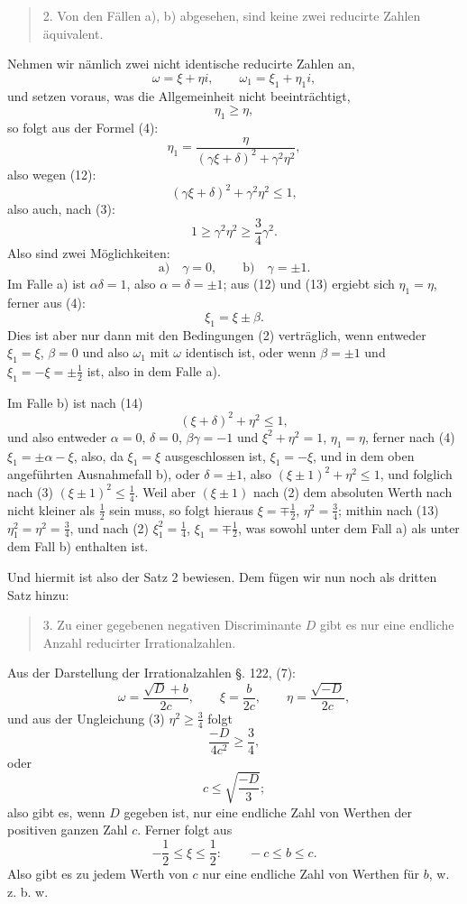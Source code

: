 \documentclass[11pt]{article}
\begin{document}
\begin{quote}
2. Von den Fällen a), b) abgesehen, sind keine zwei reducirte Zahlen äquivalent.
\end{quote}

Nehmen wir nämlich zwei nicht identische reducirte Zahlen an,
\[
\tag{11}       \omega=\xi+\eta i,
        \qquad
        \omega_1=\xi_1+\eta_1 i,
\]
und setzen voraus, was die Allgemeinheit nicht beeinträchtigt,
\[
\tag{12}       \eta_1\ge\eta,
\]
so folgt aus der Formel (4):
\[
\tag{13}       \eta_1=
\frac{\eta}{(\gamma\xi+\delta)^2+\gamma^2\eta^2},
\]
also wegen (12):
\[
\tag{14}       (\gamma\xi+\delta)^2+\gamma^2\eta^2\le1,
\]
also auch, nach (3):
\[
\tag{15}       1\ge \gamma^2\eta^2\ge \frac34\gamma^2.
\]
Also sind zwei Möglichkeiten:
\[
        \text{a)}\quad \gamma=0,
        \qquad
        \text{b)}\quad \gamma=\pm1.
\]
Im Falle a) ist $\alpha\delta=1$, also $\alpha=\delta=\pm1$; aus (12) und (13) ergiebt sich $\eta_1=\eta$, ferner aus (4):
\[
        \xi_1=\xi\pm\beta.
\]
Dies ist aber nur dann mit den Bedingungen (2) verträglich, wenn entweder $\xi_1=\xi$, $\beta=0$ und also $\omega_1$ mit $\omega$ identisch ist, oder wenn $\beta=\pm1$ und $\xi_1=-\xi=\pm\frac12$ ist, also in dem Falle a).

Im Falle b) ist nach (14)
\[
        (\xi+\delta)^2+\eta^2\le1,
\]
und also entweder $\alpha=0$, $\delta=0$, $\beta\gamma=-1$ und $\xi^2+\eta^2=1$, $\eta_1=\eta$, ferner nach (4) $\xi_1=\pm\alpha-\xi$, also, da $\xi_1=\xi$ ausgeschlossen ist, $\xi_1=-\xi$, und in dem oben angeführten Ausnahmefall b), oder $\delta=\pm1$, also $(\xi\pm1)^2+\eta^2\le1$, und folglich nach (3) $(\xi\pm1)^2\le\frac14$. Weil aber $(\xi\pm1)$ nach (2) dem absoluten Werth nach nicht kleiner als $\frac12$ sein muss, so folgt hieraus $\xi=\mp\frac12$, $\eta^2=\frac34$; mithin nach (13) $\eta_1^2=\eta^2=\frac34$, und nach (2) $\xi_1^2=\frac14$, $\xi_1=\mp\frac12$, was sowohl unter dem Fall a) als unter dem Fall b) enthalten ist.

Und hiermit ist also der Satz 2 bewiesen. Dem fügen wir nun noch als dritten Satz hinzu:
\begin{quote}
3. Zu einer gegebenen negativen Discriminante $D$ gibt es nur eine endliche Anzahl reducirter Irrationalzahlen.
\end{quote}
Aus der Darstellung der Irrationalzahlen §. 122, (7):
\[
        \omega=\frac{\sqrt D+b}{2c},
        \qquad
        \xi=\frac b{2c},
        \qquad
        \eta=\frac{\sqrt{-D}}{2c},
\]
und aus der Ungleichung (3) $\eta^2\ge\frac34$ folgt
\[
        \frac{-D}{4c^2}\ge\frac34,
\]
oder
\[
        c\le \sqrt{\frac{-D}{3}};
\]
also gibt es, wenn $D$ gegeben ist, nur eine endliche Zahl von Werthen der positiven ganzen Zahl $c$. Ferner folgt aus
\[
        -\frac12\le\xi\le\frac12:
        \qquad
        -c\le b\le c.
\]
Also gibt es zu jedem Werth von $c$ nur eine endliche Zahl von Werthen für $b$, w. z. b. w.
\end{document}

